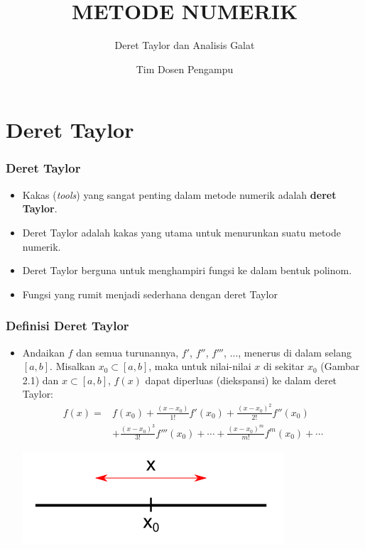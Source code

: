 \documentclass[pdflatex,compress]{beamer}
\title{METODE NUMERIK}
\subtitle{Deret Taylor dan Analisis Galat}
\author{Tim Dosen Pengampu}
\begin{document}
	
\maketitle
\section{Deret Taylor}

\begin{frame}
	\frametitle{Deret Taylor}
	\begin{itemize}
		\item Kakas (\textit{tools}) yang sangat penting dalam metode numerik adalah \textbf{deret Taylor}.
		\item Deret Taylor adalah kakas yang utama untuk menurunkan suatu metode numerik.
		\item Deret Taylor berguna untuk menghampiri fungsi ke dalam bentuk polinom.
		\item Fungsi yang rumit menjadi sederhana dengan deret Taylor
	\end{itemize}
\end{frame}

\begin{frame}
	\frametitle{Definisi Deret Taylor}
	\begin{itemize}
		\item Andaikan $ f $ dan semua turunannya, $ f' $, $ f'' $, $ f''' $, ..., menerus di dalam selang $ [a, b] $. Misalkan $ x_0 \subset [a, b] $, maka untuk nilai-nilai $ x $ di sekitar $ x_0 $ (Gambar 2.1) dan $ x \subset [a, b] $, $ f(x) $ dapat diperluas (diekspansi) ke dalam deret Taylor:
		\begin{align*}
			f(x) =& f(x_0) + \frac{(x-x_0)}{1!}f'(x_0) + \frac{(x-x_0)^2}{2!}f''(x_0) \\
			&+ \frac{(x-x_0)^3}{3!}f'''(x_0) + \cdots + \frac{(x-x_0)^m}{m!}f^m(x_0) + \cdots
		\end{align*}
		\begin{center}
			\includegraphics[width=0.5\linewidth]{img/img101}
		\end{center}
	\end{itemize}
\end{frame}
\end{document}

